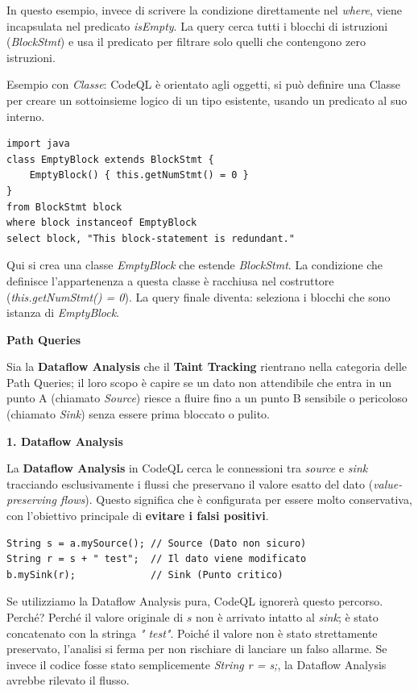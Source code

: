 In questo esempio, invece di scrivere la condizione direttamente nel \textit{where}, 
viene incapsulata nel predicato \textit{isEmpty}. La query cerca tutti i blocchi di 
istruzioni (\textit{BlockStmt}) e usa il predicato per filtrare solo quelli che 
contengono zero istruzioni.

Esempio con \textit{Classe}: CodeQL è orientato agli oggetti, si può definire una 
Classe per creare un sottoinsieme logico di un tipo esistente, usando un predicato 
al suo interno.

\begin{lstlisting}
import java
class EmptyBlock extends BlockStmt {
    EmptyBlock() { this.getNumStmt() = 0 }
}
from BlockStmt block
where block instanceof EmptyBlock
select block, "This block-statement is redundant."
\end{lstlisting}

Qui si crea una classe \textit{EmptyBlock} che estende \textit{BlockStmt}. La 
condizione che definisce l'appartenenza a questa classe è racchiusa nel 
costruttore (\textit{this.getNumStmt() = 0}). La query finale diventa: seleziona i 
blocchi che sono istanza di \textit{EmptyBlock}.

\textbf{Path Queries}

Sia la \textbf{Dataflow Analysis} che il \textbf{Taint Tracking} rientrano nella 
categoria delle Path Queries; il loro scopo è capire se un dato non attendibile che 
entra in un punto A (chiamato \textit{Source}) riesce a fluire fino a un punto B 
sensibile o pericoloso (chiamato \textit{Sink}) senza essere prima bloccato o pulito.

\textbf{1. Dataflow Analysis}

La \textbf{Dataflow Analysis} in CodeQL cerca le connessioni tra \textit{source} e \textit{sink} 
tracciando esclusivamente i flussi che preservano il valore esatto del dato 
(\textit{value-preserving flows}). Questo significa che è configurata per essere 
molto conservativa, con l'obiettivo principale di \textbf{evitare i falsi positivi}.

\begin{lstlisting}
String s = a.mySource(); // Source (Dato non sicuro)
String r = s + " test";  // Il dato viene modificato
b.mySink(r);             // Sink (Punto critico)
\end{lstlisting}

Se utilizziamo la Dataflow Analysis pura, CodeQL ignorerà questo percorso. Perché? 
Perché il valore originale di $s$ non è arrivato intatto al \textit{sink}; è stato 
concatenato con la stringa \textit{" test"}. Poiché il valore non è stato 
strettamente preservato, l'analisi si ferma per non rischiare di lanciare un falso 
allarme. Se invece il codice fosse stato semplicemente \textit{String r = s;}, la 
Dataflow Analysis avrebbe rilevato il flusso.

